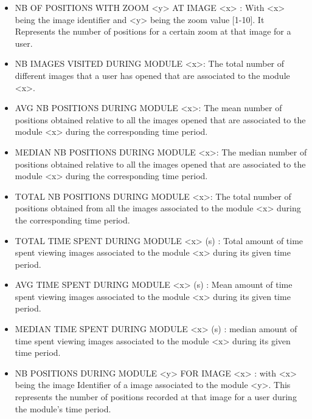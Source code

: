 \documentclass[a4paper,11pt]{report}
\numberwithin{figure}{section} %
\begin{document}
\begin{itemize}
    \item[\textbullet] NB OF POSITIONS WITH ZOOM <y> AT IMAGE <x> : With <x> being the image identifier and <y> being the zoom value [1-10]. It Represents the number of positions for a certain zoom  at that image for a user. \\

    \item[\textbullet] NB IMAGES VISITED DURING MODULE <x>: The total number of different images that a user has opened that are associated to the module <x>.\\
    
    \item[\textbullet] AVG NB POSITIONS DURING MODULE <x>: The mean number of positions obtained relative to all the images opened that are associated to the module <x> during the corresponding time period.\\
    
    \item[\textbullet] MEDIAN NB POSITIONS DURING MODULE <x>: The median number of positions obtained relative to all the images opened that are associated to the module <x> during the corresponding time period.\\
    
    \item[\textbullet] TOTAL NB POSITIONS DURING MODULE <x>: The total number of positions obtained from all the images associated to the module <x> during the corresponding time period.\\
    
    \item[\textbullet] TOTAL TIME SPENT DURING MODULE <x> (s) : Total amount of time spent viewing images associated to the module <x> during its given time period.\\    
    
    \item[\textbullet] AVG TIME SPENT DURING MODULE <x> (s) : Mean amount of time spent viewing images associated to the module <x> during its given time period.\\    
    
    \item[\textbullet] MEDIAN TIME SPENT DURING MODULE <x> (s) : median amount of time spent viewing images associated to the module <x> during its given time period.\\
    
    \item[\textbullet] NB POSITIONS DURING MODULE <y> FOR IMAGE <x> : with <x> being the image Identifier of a image associated to the module <y>. This represents the number of positions recorded at that image for a user during the module's time period. \\ 
       

\end{itemize}
\end{document}
